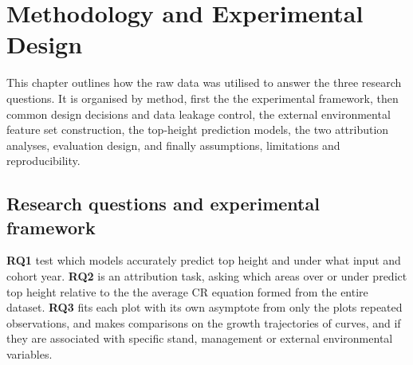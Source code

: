 \newcommand{\fc}[1]{\textcolor{red}{[FactC: #1]}} 
\newcommand{\ct}[1]{\textcolor{orange}{[CITE: #1]}} 
\newcommand{\app}[1]{\textcolor{blue}{[APP: #1]}} 
\newcommand{\sr}[1]{\textcolor{teal}{[Sreword: #1]}}
\newcommand{\fig}[1]{\textcolor{purple}{[FIG: #1]}}

\chapter{Methodology and Experimental Design}
\label{ch:methodology}

This chapter outlines how the raw data was utilised to answer the three research questions. It is organised by method, first the the experimental framework, then common design decisions and data leakage control, the external environmental feature set construction, the top-height prediction models, the two attribution analyses, evaluation design, and finally assumptions, limitations and reproducibility. 

\section{Research questions and experimental framework}
\textbf{RQ1} test which models accurately predict top height and under what input and cohort year. \textbf{RQ2} is an attribution task, asking which areas over or under predict top height relative to the the average CR equation formed from the entire dataset. \textbf{RQ3} fits each plot with its own asymptote from only the plots repeated observations, and makes comparisons on the growth trajectories of curves, and if they are associated with specific stand, management or external environmental variables. 


